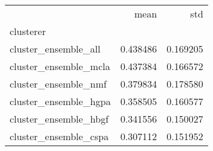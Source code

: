 \begin{tabular}{lrr}
\toprule
{} &      mean &       std \\
clusterer             &           &           \\
\midrule
cluster\_ensemble\_all  &  0.438486 &  0.169205 \\
cluster\_ensemble\_mcla &  0.437384 &  0.166572 \\
cluster\_ensemble\_nmf  &  0.379834 &  0.178580 \\
cluster\_ensemble\_hgpa &  0.358505 &  0.160577 \\
cluster\_ensemble\_hbgf &  0.341556 &  0.150027 \\
cluster\_ensemble\_cspa &  0.307112 &  0.151952 \\
\bottomrule
\end{tabular}

